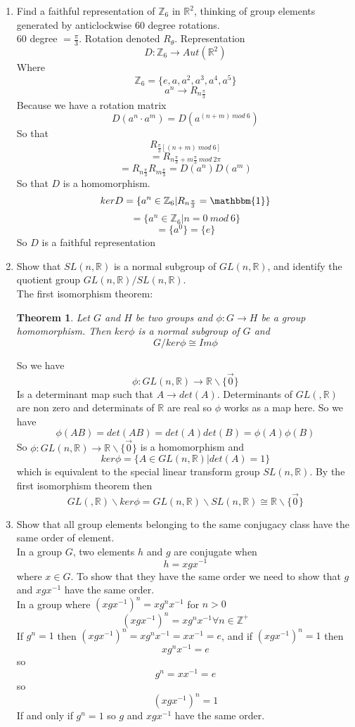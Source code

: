 \documentclass[12pt]{article}
\newcommand{\R}{\mathbb{R}}
\newtheorem{theorem}{Theorem}
\begin{document}
\begin{enumerate}
\item Find a faithful representation of $\mathbb{Z}_6$ in $\mathbb{R}^2$, thinking of group elements generated by anticlockwise 60 degree rotations.
\\
60 degree $ = \frac{\pi}{3}$. Rotation denoted $R_\theta$. Representation 
$$ D: \mathbb{Z}_6 \rightarrow Aut(\mathbb{R}^2) $$
Where 
$$ \mathbb{Z}_6 = \{e,a,a^2,a^3,a^4,a^5\} $$
$$ a^n \rightarrow R_{n \frac{\pi}{3}} $$
Because we have a rotation matrix
$$ D(a^n \cdot a^m) = D (a^{(n+m) \ mod \ 6}) $$
So that 
$$ R_{\frac{\pi}{3} [ (n+m) \ mod \ 6 ]} $$
$$ = R_{n \frac{\pi}{3}+m \frac{\pi}{3} \ mod \ 2 \pi} $$
$$ = R_{n \frac{\pi}{3}}R_{m \frac{\pi}{3}} = D(a^n) D(a^m) $$
So that $D$ is a homomorphism. 
$$ ker D = \{ a^n \in \mathbb{Z}_6 | R_{n \frac{\pi}{3}} = \mathbbm{1} \} $$
$$ = \{ a^n \in \mathbb{Z}_6 | n = 0 \ mod \ 6 \} $$
$$ = \{ a^0\} = \{ e\} $$
So $D$ is a faithful representation 

\item Show that $SL(n,\mathbb{R})$ is a normal subgroup of  $GL(n,\R)$, and identify the quotient group $GL(n,\R)/SL(n,\R)$.
\\ The first isomorphism theorem:
\begin{theorem}
  Let $G$ and $H$ be two groups and $\phi : G \rightarrow H$ be a group homomorphism. Then $ker \phi$ is a normal subgroup of $G$ and 
  $$ G / ker \phi \cong Im \phi $$
\end{theorem}
So we have 
$$ \phi : GL(n, \mathbb{R}) \rightarrow \mathbb{R} \backslash \{\vec{0}\} $$
Is a determinant map such that $A \rightarrow det(A)$. Determinants of $GL(,\mathbb{R})$ are non zero and determinats of $\mathbb{R}$ are real so $\phi$ works as a map here. So we have 
$$ \phi(AB) = det(AB) = det(A) det(B) = \phi(A) \phi(B) $$ 
So $\phi : GL(n, \mathbb{R}) \rightarrow \mathbb{R} \backslash \{\vec{0}\}$ is a homomorphism and 
$$ ker \phi = \{ A \in GL(n,\mathbb{R}) | det(A) =1 \} $$
which is equivalent to the special linear transform group $SL(n,\mathbb{R})$. By the first isomorphism theorem then 
$$ GL(,\mathbb{R}) \backslash ker \phi = GL(n, \mathbb{R}) \backslash SL(n, \mathbb{R}) \cong \mathbb{R} \backslash \{\vec{0}\} $$


\item Show that all group elements belonging to the same conjugacy class have the same order of element.
\\
In a group $G$, two elements $h$ and $g$ are conjugate when 
$$ h = x g x^{-1} $$
where $ x \in G$. To show that they have the same order we need to show that $g$ and $x g x^{-1} $ have the same order.
\\
In a group where $(x g x^{-1})^n = xg^n x^{-1}$ for $n>0$
$$ (x g x^{-1})^n = x g^n x^{-1} \forall n \in \mathbb{Z}^+$$ 
If $g^n =1$ then $(xgx^{-1})^n = xg^n x^{-1} = x x^{-1} = e$, and if $(x g x^{-1})^n =1$ then 
$$ x g^n x^{-1} = e$$
so 
$$ g^n = x x^{-1} = e $$ 
so 
$$ (x g x^{-1})^n =1$$
If and only if $g^n =1$ so $g$ and $x g x^{-1} $ have the same order. 


\end{enumerate}
\end{document}
